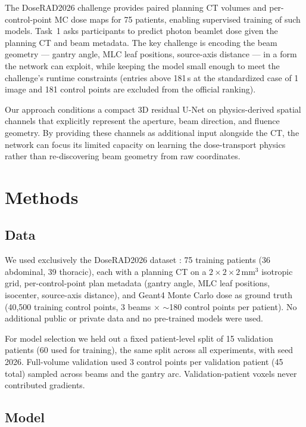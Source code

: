 \documentclass[runningheads]{llncs}
\begin{document}
The DoseRAD2026 challenge \cite{doserad_data} provides paired planning CT volumes and per-control-point MC dose maps for 75 patients, enabling supervised training of such models. Task~1 asks participants to predict photon beamlet dose given the planning CT and beam metadata. The key challenge is encoding the beam geometry --- gantry angle, MLC leaf positions, source-axis distance --- in a form the network can exploit, while keeping the model small enough to meet the challenge's runtime constraints (entries above 181\,s at the standardized case of 1 image and 181 control points are excluded from the official ranking).

Our approach conditions a compact 3D residual U-Net on physics-derived spatial channels that explicitly represent the aperture, beam direction, and fluence geometry. By providing these channels as additional input alongside the CT, the network can focus its limited capacity on learning the dose-transport physics rather than re-discovering beam geometry from raw coordinates.

\section{Methods}

\subsection{Data}
We used exclusively the DoseRAD2026 dataset \cite{doserad_data}: 75 training patients (36 abdominal, 39 thoracic), each with a planning CT on a $2\times2\times2$\,mm$^3$ isotropic grid, per-control-point plan metadata (gantry angle, MLC leaf positions, isocenter, source-axis distance), and Geant4 \cite{geant4} Monte Carlo dose as ground truth (40{,}500 training control points, 3 beams $\times$ $\sim$180 control points per patient). No additional public or private data and no pre-trained models were used.

For model selection we held out a fixed patient-level split of 15 validation patients (60 used for training), the same split across all experiments, with seed 2026. Full-volume validation used 3 control points per validation patient (45 total) sampled across beams and the gantry arc. Validation-patient voxels never contributed gradients.

\subsection{Model}
\end{document}
